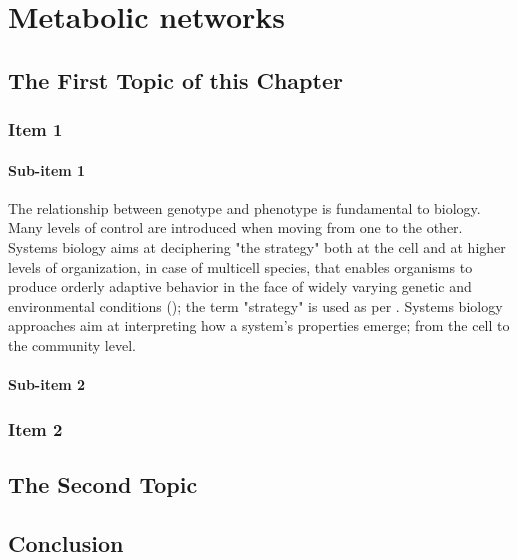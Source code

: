 \chapter{Metabolic networks}
\label{cha:n}


\section{The First Topic of this Chapter}
\subsection{Item 1}
\subsubsection{Sub-item 1}
The relationship between genotype and phenotype is fundamental to biology.
Many levels of control are introduced when moving from one to the other. 
Systems biology aims at deciphering "the strategy" both at the cell and at higher levels of organization, in case of multicell species, that enables organisms to produce orderly adaptive behavior in the face of widely varying genetic and environmental conditions (\cite{strohman2002maneuvering}); the term "strategy" is used as per \cite{polanyi1968life}.
Systems biology approaches aim at interpreting how a system's properties emerge; from the cell to the community level.



\subsubsection{Sub-item 2}


\subsection{Item 2}


\section{The Second Topic}


\section{Conclusion}
\lipsum[86-88]

